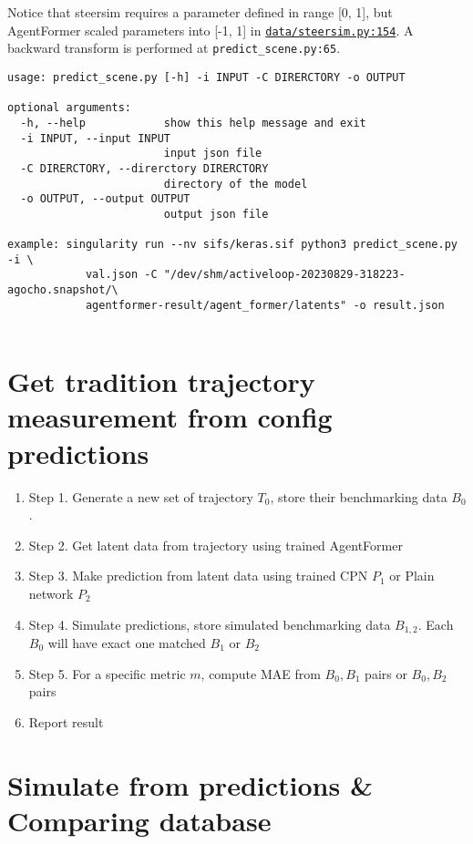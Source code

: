 Notice that steersim requires a parameter defined in range [0, 1], but 
AgentFormer scaled parameters into [-1, 1] in \href{ 
https://github.com/hukaidong/MyAgentFormer/blob/e78cd3247d2a2691a5a8ca524b4c7b541fd2f55b/data/steersim.py#L154 
}{\texttt{data/steersim.py:154}}.  A backward transform is performed 
at \texttt{predict_scene.py:65}.

\begin{verbatim}
usage: predict_scene.py [-h] -i INPUT -C DIRERCTORY -o OUTPUT

optional arguments:
  -h, --help            show this help message and exit
  -i INPUT, --input INPUT
                        input json file
  -C DIRERCTORY, --direrctory DIRERCTORY
                        directory of the model
  -o OUTPUT, --output OUTPUT
                        output json file

example: singularity run --nv sifs/keras.sif python3 predict_scene.py -i \
            val.json -C "/dev/shm/activeloop-20230829-318223-agocho.snapshot/\
            agentformer-result/agent_former/latents" -o result.json
  
\end{verbatim}

\section{Get tradition trajectory measurement from config predictions} %
\label{sec:resim-measure-precedure}
\begin{enumerate}
  \item Step 1. Generate a new set of trajectory $T_0$, store their 
    benchmarking data $B_0$.
  \item Step 2. Get latent data from trajectory using trained AgentFormer
  \item Step 3. Make prediction from latent data using trained CPN $P_1$ or 
    Plain network $P_2$
  \item Step 4. Simulate predictions, store simulated benchmarking data $B_{1, 
    2}$. Each $B_0$ will have exact one matched $B_1$ or $B_2$
  \item Step 5. For a specific metric $m$, compute MAE from $B_0, B_1$ pairs or 
    $B_0, B_2$ pairs
  \item Report result
\end{enumerate}

\section{Simulate from predictions \& Comparing database} %

